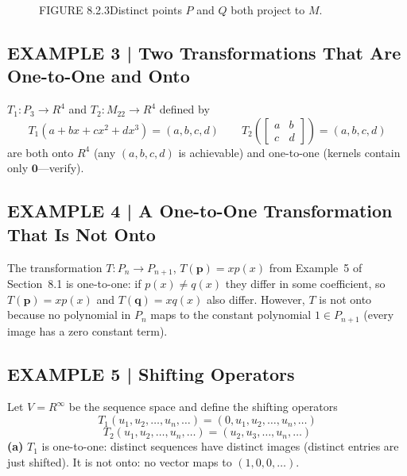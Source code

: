 \documentclass{article}
\begin{document}
\begin{figure}[ht]
\centering
{}
\caption*{FIGURE 8.2.3\quad Distinct points $P$ and $Q$ both project to $M$.}
\end{figure}

\subsection*{EXAMPLE 3 | Two Transformations That Are One-to-One and Onto}

$T_1 : P_3 \to R^4$ and $T_2 : M_{22} \to R^4$ defined by
\[
  T_1(a+bx+cx^2+dx^3) = (a,b,c,d) \qquad
  T_2\!\left(\begin{bmatrix}a&b\\c&d\end{bmatrix}\right) = (a,b,c,d)
\]
are both onto $R^4$ (any $(a,b,c,d)$ is achievable) and one-to-one (kernels contain only
$\mathbf{0}$—verify).

\subsection*{EXAMPLE 4 | A One-to-One Transformation That Is Not Onto}

The transformation $T : P_n \to P_{n+1}$, $T(\mathbf{p}) = xp(x)$ from Example~5 of
Section~8.1 is one-to-one: if $p(x) \neq q(x)$ they differ in some coefficient, so
$T(\mathbf{p}) = xp(x)$ and $T(\mathbf{q}) = xq(x)$ also differ. However, $T$ is not onto
because no polynomial in $P_n$ maps to the constant polynomial $1 \in P_{n+1}$ (every
image has a zero constant term).

\subsection*{EXAMPLE 5 | Shifting Operators}

Let $V = R^\infty$ be the sequence space and define the shifting operators
\[
  T_1(u_1,u_2,\ldots,u_n,\ldots) = (0,u_1,u_2,\ldots,u_n,\ldots)
\]
\[
  T_2(u_1,u_2,\ldots,u_n,\ldots) = (u_2,u_3,\ldots,u_n,\ldots)
\]
\textbf{(a)} $T_1$ is one-to-one: distinct sequences have distinct images (distinct entries
are just shifted). It is not onto: no vector maps to $(1,0,0,\ldots)$.
\end{document}
